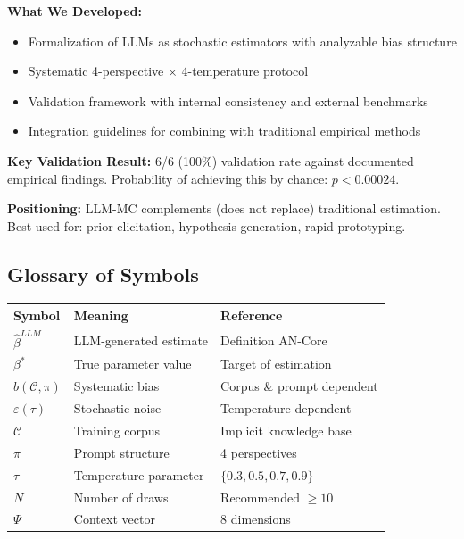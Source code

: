 \begin{tcolorbox}[colback=blue!5!white, colframe=blue!75!black,
    title=\textbf{Summary: LLM Monte Carlo Methodology}]

\textbf{What We Developed:}
\begin{itemize}[nosep]
    \item Formalization of LLMs as stochastic estimators with analyzable bias structure
    \item Systematic 4-perspective $\times$ 4-temperature protocol
    \item Validation framework with internal consistency and external benchmarks
    \item Integration guidelines for combining with traditional empirical methods
\end{itemize}

\textbf{Key Validation Result:}
6/6 (100\%) validation rate against documented empirical findings.
Probability of achieving this by chance: $p < 0.00024$.

\textbf{Positioning:}
LLM-MC complements (does not replace) traditional estimation.
Best used for: prior elicitation, hypothesis generation, rapid prototyping.

\end{tcolorbox}


\subsection{Glossary of Symbols}
\label{sec:AN-glossary}

\begin{center}
\begin{tabular}{@{}lll@{}}
\toprule
\textbf{Symbol} & \textbf{Meaning} & \textbf{Reference} \\
\midrule
$\hat{\beta}^{LLM}$ & LLM-generated estimate & Definition AN-Core \\
$\beta^*$ & True parameter value & Target of estimation \\
$b(\mathcal{C}, \pi)$ & Systematic bias & Corpus \& prompt dependent \\
$\varepsilon(\tau)$ & Stochastic noise & Temperature dependent \\
$\mathcal{C}$ & Training corpus & Implicit knowledge base \\
$\pi$ & Prompt structure & 4 perspectives \\
$\tau$ & Temperature parameter & $\{0.3, 0.5, 0.7, 0.9\}$ \\
$N$ & Number of draws & Recommended $\geq 10$ \\
$\Psi$ & Context vector & 8 dimensions \\
\bottomrule
\end{tabular}
\end{center}

